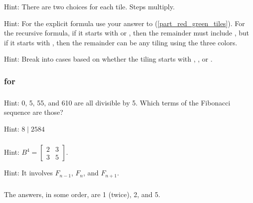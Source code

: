\subsubsection*{ \answers}
\begin{apart}
    \item Hint: There are two choices for each tile.  Steps multiply.
    \item Hint: For the explicit formula use your answer to (\ref{part_red_green_tiles}). For the recursive formula, if it starts with  or , then the remainder must include , but if it starts with , then the remainder can be any tiling using the three colors.
    \item Hint: Break into cases based on whether the tiling starts with , , or .
\end{apart}

\subsubsection{\answers for  \subfibpatterns}

\subsubsection*{ \answers}
\begin{apart}
    \item Hint: 0, 5, 55, and 610 are all divisible by 5. Which terms of the Fibonacci sequence are those?
    \item Hint: $8 \mid 2584$
\end{apart}

\subsubsection*{ \answers}
\begin{apart}
    \item Hint: $B^4=\left[\begin{array}{cc} 2 & 3\\ 3 & 5 \end{array} \right]$.
    \item Hint: It involves $F_{n-1}$, $F_n$, and $F_{n+1}$.
\end{apart}

\subsubsection*{ \answers}
The answers, in some order, are 1 (twice), 2, and 5.

